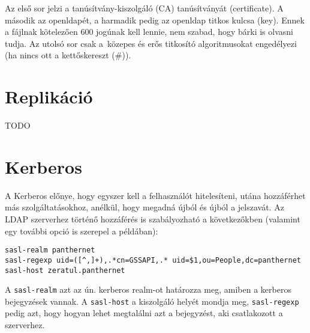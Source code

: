Az első sor jelzi a tanúsítvány-kiszolgáló (CA) tanúsítványát (certificate). A második az openldapét, a harmadik pedig
az openldap titkos kulcsa (key). Ennek a fájlnak kötelezően 600 jogúnak kell lennie, nem szabad, hogy bárki is olvasni
tudja. Az utolsó sor csak a~közepes és erős titkosító algoritmusokat engedélyezi (ha nincs ott a kettőskereszt (\#)).


\section{Replikáció}

TODO

\section{Kerberos}

A Kerberos előnye, hogy egyszer kell a felhasználót hitelesíteni, utána hozzáférhet más szolgáltatásokhoz, anélkül, hogy
megadná újból és újból a jelszavát. Az LDAP szerverhez történő hozzáférés is szabályozható a következőkben (valamint egy
további opció is szerepel a példában):

\begin{Verbatim}[frame=single]
sasl-realm panthernet
sasl-regexp uid=([^,]+),.*cn=GSSAPI,.* uid=$1,ou=People,dc=panthernet
sasl-host zeratul.panthernet
\end{Verbatim}

A \texttt{sasl-realm} azt az ún. kerberos realm-ot határozza meg, amiben a kerberos bejegyzések vannak. A
\texttt{sasl-host} a kiszolgáló helyét mondja meg, \texttt{sasl-regexp} pedig azt, hogy hogyan lehet megtalálni azt a
bejegyzést, aki csatlakozott a szerverhez.

